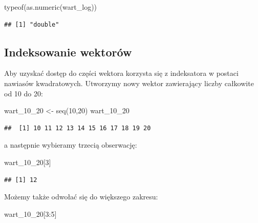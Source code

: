 \documentclass[
]{book}
\newenvironment{Shaded}{\begin{snugshade}}{\end{snugshade}}
\newcommand{\DecValTok}[1]{\textcolor[rgb]{0.00,0.00,0.81}{#1}}
\newcommand{\FunctionTok}[1]{\textcolor[rgb]{0.00,0.00,0.00}{#1}}
\newcommand{\NormalTok}[1]{#1}
\newcommand{\OtherTok}[1]{\textcolor[rgb]{0.56,0.35,0.01}{#1}}
\newcommand{\SpecialCharTok}[1]{\textcolor[rgb]{0.00,0.00,0.00}{#1}}
\begin{document}
\begin{Shaded}
\begin{Highlighting}[]
\FunctionTok{typeof}\NormalTok{(}\FunctionTok{as.numeric}\NormalTok{(wart\_log))}
\end{Highlighting}
\end{Shaded}

\begin{verbatim}
## [1] "double"
\end{verbatim}

\hypertarget{indeksowanie-wektoruxf3w}{%
\subsection{Indeksowanie wektorów}\label{indeksowanie-wektoruxf3w}}

Aby uzyskać dostęp do części wektora korzysta się z indeksatora w postaci nawiasów kwadratowych. Utworzymy nowy wektor zawierający liczby całkowite od 10 do 20:

\begin{Shaded}
\begin{Highlighting}[]
\NormalTok{wart\_10\_20 }\OtherTok{\textless{}{-}} \FunctionTok{seq}\NormalTok{(}\DecValTok{10}\NormalTok{,}\DecValTok{20}\NormalTok{)}
\NormalTok{wart\_10\_20}
\end{Highlighting}
\end{Shaded}

\begin{verbatim}
##  [1] 10 11 12 13 14 15 16 17 18 19 20
\end{verbatim}

a następnie wybieramy trzecią obserwację:

\begin{Shaded}
\begin{Highlighting}[]
\NormalTok{wart\_10\_20[}\DecValTok{3}\NormalTok{]}
\end{Highlighting}
\end{Shaded}

\begin{verbatim}
## [1] 12
\end{verbatim}

Możemy także odwołać się do większego zakresu:

\begin{Shaded}
\begin{Highlighting}[]
\NormalTok{wart\_10\_20[}\DecValTok{3}\SpecialCharTok{:}\DecValTok{5}\NormalTok{]}
\end{Highlighting}
\end{Shaded}
\end{document}
